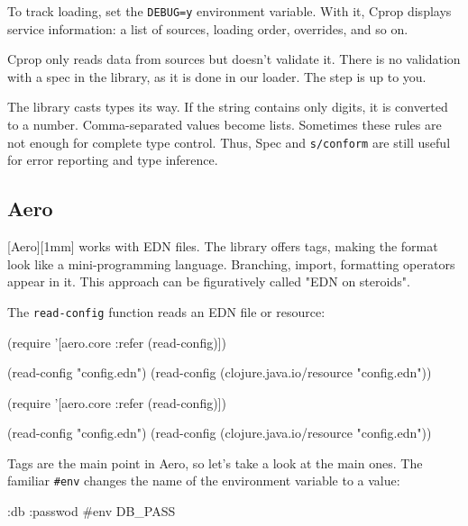 To track loading, set the \verb|DEBUG=y| environment variable. With it, Cprop displays service information: a list of sources, loading order, overrides, and so on.

Cprop only reads data from sources but doesn't validate it. There is no validation with a spec in the library, as it is done in our loader. The step is up to you.

The library casts types its way. If the string contains only digits, it is converted to a number. Comma-separated values become lists. Sometimes these rules are not enough for complete type control. Thus, Spec and \verb|s/conform| are still useful for error reporting and type inference.

\subsection{Aero}


[Aero][1mm] works with EDN files. The library offers tags, making the format look like a mini-programming language. Branching, import, formatting operators appear in it. This approach can be figuratively called "EDN on steroids".


The \verb|read-config| function reads an EDN file or resource:

\ifnarrow

\begin{clojure}
(require
  '[aero.core :refer (read-config)])

(read-config "config.edn")
(read-config
  (clojure.java.io/resource
    "config.edn"))
\end{clojure}

\else

\begin{clojure}
(require '[aero.core :refer (read-config)])

(read-config "config.edn")
(read-config (clojure.java.io/resource "config.edn"))
\end{clojure}

\fi


Tags are the main point in Aero, so let's take a look at the main ones. The familiar \verb|#env| changes the name of the environment variable to a value:

\begin{clojure}
{:db {:passwod #env DB_PASS}}
\end{clojure}

